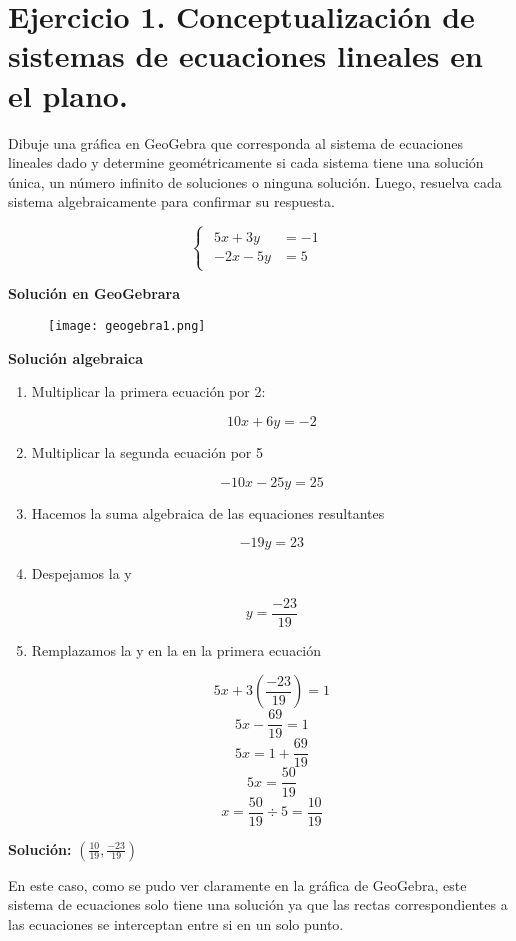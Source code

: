 \section{Ejercicio 1. Conceptualización de sistemas de ecuaciones lineales en el plano.}

Dibuje una gráfica en GeoGebra que corresponda al sistema de ecuaciones lineales dado y determine geométricamente si cada sistema tiene una solución única, un número infinito de soluciones o ninguna solución. Luego, resuelva cada sistema algebraicamente para confirmar su respuesta.

\[
\begin{cases}
    \begin{aligned}
        5x+3y &=-1 \\
        -2x-5y &=5
    \end{aligned}
\end{cases}
\]

\textbf{Solución en GeoGebrara}
\begin{figure}[ht!]
    \texttt{[image: geogebra1.png]}
\end{figure}

\textbf{Solución algebraica}

\begin{enumerate}
    \item Multiplicar la primera ecuación por 2:
    
    \[10x+6y=-2\]

    \item Multiplicar la segunda ecuación por 5
    
    \[-10x-25y=25\]

    \item Hacemos la suma algebraica de las equaciones resultantes
    
    \[-19y=23\]

    \item Despejamos la y
    
    \[y=\frac{-23}{19}\]
    
    \item Remplazamos la y en la en la primera ecuación
    
    \[5x+3\left(\frac{-23}{19}\right)=1\]
    \[5x-\frac{69}{19}=1\]
    \[5x=1+\frac{69}{19}\]
    \[5x=\frac{50}{19}\]
    \[x=\frac{50}{19}\div5=\frac{10}{19}\]
\end{enumerate}

\begin{center}
    \textbf{Solución:} \(\left(\frac{10}{19},\frac{-23}{19}\right)\)
\end{center}

En este caso, como se pudo ver claramente en la gráfica de GeoGebra, este sistema de ecuaciones solo tiene una solución ya que las rectas correspondientes a las ecuaciones se interceptan entre si en un solo punto.
